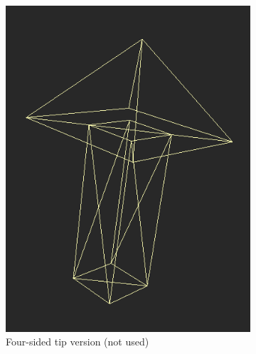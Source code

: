\begin{figure}[h]
\centering
	\begin{subfigure}{0.3\textwidth}
	\includegraphics[width=\textwidth]{./img/4sided_arrow.PNG}
    \caption{Four-sided tip version (not used)}
    \label{fig:4sided_arrow}
	\end{subfigure}
    \qquad
    \begin{subfigure}{0.3\textwidth}

\end{subfigure}
\end{figure}

